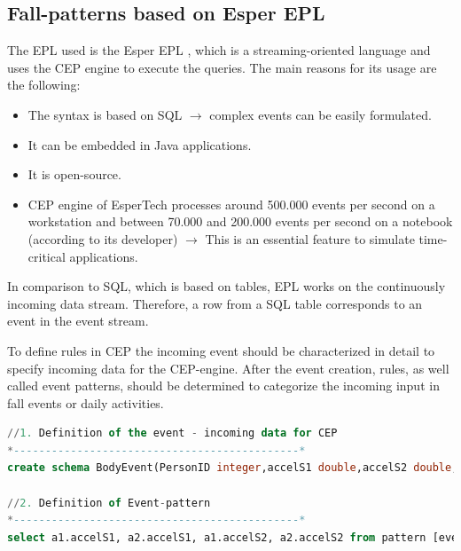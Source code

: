 \documentclass[10pt,journal,compsoc]{IEEEtran}
\begin{document}
\subsection{Fall-patterns based on Esper EPL}
\label{subsec:CEP}
The EPL used is the Esper EPL \cite{Esper:2016}, which is a streaming-oriented language and uses the CEP engine to execute the queries. The main reasons for its usage are the following:
\begin{itemize}
	\item The syntax is based on SQL $\rightarrow$ complex events can be easily formulated.
	\item It can be embedded in Java applications.
	\item It is open-source.
	\item CEP engine of EsperTech processes around 500.000 events per second on a workstation and between 70.000 and 200.000 events per second on a notebook (according to its developer) $\rightarrow$ This is an essential feature to simulate time-critical applications. 
\end{itemize}
In comparison to SQL, which is based on tables, EPL works on the continuously incoming data stream. Therefore, a row from a SQL table corresponds to an event in the event stream. 

To define rules in CEP the incoming event should be characterized in detail to specify incoming data for the CEP-engine. After the event creation, rules, as well called event patterns, should be determined to categorize the incoming input in fall events or daily activities.
\renewcommand{\lstlistingname}{Example}
\begin{lstlisting}[basicstyle=\ttfamily\footnotesize,language=SQL,caption=Fall pattern based on Kozina et al. \cite{Kozina},label=CEPPattern, breaklines=true]
//1. Definition of the event - incoming data for CEP
*---------------------------------------------*
create schema BodyEvent(PersonID integer,accelS1 double,accelS2 double,timestamp string)

//2. Definition of Event-pattern
*---------------------------------------------*
select a1.accelS1, a2.accelS1, a1.accelS2, a2.accelS2 from pattern [every(a1=BodyEvent(a1.accelS1 <= 9.81) -> a2=BodyEvent(a2.accelS1-a1.accelS1 >= 9.81 and a1.PersonID = a2.PersonID) where timer:within(1sec)) or every (a1=BodyEvent(a1.accelS2 <= 9.81)-> a2=BodyEvent(a2.accelS2-a1.accelS2 >= 9.81 and a1.PersonID = a2.PersonID) where timer:within(1sec))];
\end{lstlisting}
\end{document}
